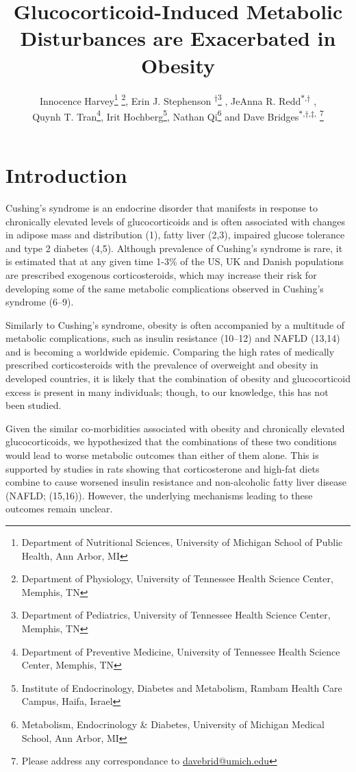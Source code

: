\documentclass[11pt]{article} %
\date{} %
\title{Glucocorticoid-Induced Metabolic Disturbances are Exacerbated in
Obesity}
\author{Innocence Harvey\footnote{Department of Nutritional Sciences, University of Michigan School of Public Health, Ann Arbor, MI} \footnote{Department of Physiology, University of Tennessee Health Science Center, Memphis, TN}, Erin J. Stephenson \textsuperscript{$\dagger$}\footnote{Department of Pediatrics, University of Tennessee Health Science Center, Memphis, TN} , JeAnna R. Redd\textsuperscript{$\ast$,$\dagger$} ,\\ Quynh T. Tran\footnote{Department of Preventive Medicine, University of Tennessee Health Science Center, Memphis, TN},
Irit Hochberg\footnote{ Institute of Endocrinology, Diabetes and Metabolism, Rambam Health Care Campus, Haifa, Israel}, Nathan Qi\footnote{Metabolism, Endocrinology \& Diabetes, University of Michigan Medical School, Ann Arbor, MI} and Dave Bridges\textsuperscript{$\ast$,$\dagger$,$\ddagger$,} \footnote{Please address any correspondance to \href{mailto:davebrid@umich.edu}{davebrid@umich.edu}}}
\begin{document}
\maketitle


\section*{Introduction}

Cushing's syndrome is an endocrine disorder that manifests in response
to chronically elevated levels of glucocorticoids and is often
associated with changes in adipose mass and distribution (1), fatty
liver (2,3), impaired glucose tolerance and type 2 diabetes (4,5).
Although prevalence of Cushing's syndrome is rare, it is estimated that
at any given time 1-3\% of the US, UK and Danish populations are
prescribed exogenous corticosteroids, which may increase their risk for
developing some of the same metabolic complications observed in
Cushing's syndrome (6--9).

Similarly to Cushing's syndrome, obesity is often accompanied by a
multitude of metabolic complications, such as insulin resistance
(10--12) and NAFLD (13,14) and is becoming a worldwide epidemic.
Comparing the high rates of medically prescribed corticosteroids with
the prevalence of overweight and obesity in developed countries, it is
likely that the combination of obesity and glucocorticoid excess is
present in many individuals; though, to our knowledge, this has not been
studied.

Given the similar co-morbidities associated with obesity and chronically
elevated glucocorticoids, we hypothesized that the combinations of these
two conditions would lead to worse metabolic outcomes than either of
them alone. This is supported by studies in rats showing that
corticosterone and high-fat diets combine to cause worsened insulin
resistance and non-alcoholic fatty liver disease (NAFLD; (15,16)).
However, the underlying mechanisms leading to these outcomes remain
unclear.
\end{document}
